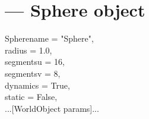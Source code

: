 
\section{ ---
         Sphere object}

\begin{classdesc}{Sphere}{name = "Sphere",\\ 
                       radius = 1.0,\\
                       segmentsu = 16,\\
                       segmentsv = 8,\\
                       dynamics = True,\\
                       static = False,\\
                       ...[WorldObject params]...
		       }

\end{classdesc}



